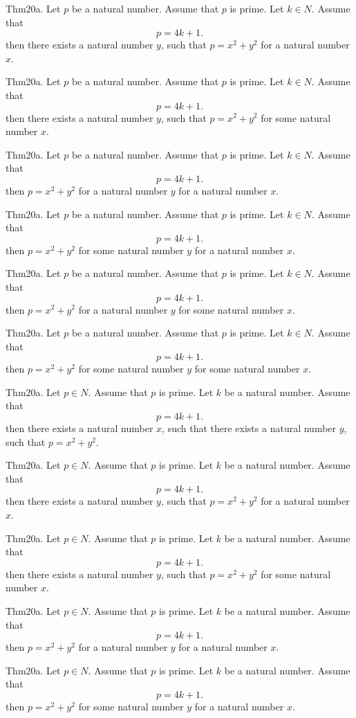 \documentclass{article}
\begin{document}
Thm20a. Let $p$ be a natural number. Assume that $p$ is prime. Let $k \in N$. Assume that $$p = 4 k + 1.$$ then there exists a natural number $y$, such that $p = x ^{ 2}+ y ^{ 2}$ for a natural number $x$.

Thm20a. Let $p$ be a natural number. Assume that $p$ is prime. Let $k \in N$. Assume that $$p = 4 k + 1.$$ then there exists a natural number $y$, such that $p = x ^{ 2}+ y ^{ 2}$ for some natural number $x$.

Thm20a. Let $p$ be a natural number. Assume that $p$ is prime. Let $k \in N$. Assume that $$p = 4 k + 1.$$ then $p = x ^{ 2}+ y ^{ 2}$ for a natural number $y$ for a natural number $x$.

Thm20a. Let $p$ be a natural number. Assume that $p$ is prime. Let $k \in N$. Assume that $$p = 4 k + 1.$$ then $p = x ^{ 2}+ y ^{ 2}$ for some natural number $y$ for a natural number $x$.

Thm20a. Let $p$ be a natural number. Assume that $p$ is prime. Let $k \in N$. Assume that $$p = 4 k + 1.$$ then $p = x ^{ 2}+ y ^{ 2}$ for a natural number $y$ for some natural number $x$.

Thm20a. Let $p$ be a natural number. Assume that $p$ is prime. Let $k \in N$. Assume that $$p = 4 k + 1.$$ then $p = x ^{ 2}+ y ^{ 2}$ for some natural number $y$ for some natural number $x$.

Thm20a. Let $p \in N$. Assume that $p$ is prime. Let $k$ be a natural number. Assume that $$p = 4 k + 1.$$ then there exists a natural number $x$, such that there exists a natural number $y$, such that $p = x ^{ 2}+ y ^{ 2}$.

Thm20a. Let $p \in N$. Assume that $p$ is prime. Let $k$ be a natural number. Assume that $$p = 4 k + 1.$$ then there exists a natural number $y$, such that $p = x ^{ 2}+ y ^{ 2}$ for a natural number $x$.

Thm20a. Let $p \in N$. Assume that $p$ is prime. Let $k$ be a natural number. Assume that $$p = 4 k + 1.$$ then there exists a natural number $y$, such that $p = x ^{ 2}+ y ^{ 2}$ for some natural number $x$.

Thm20a. Let $p \in N$. Assume that $p$ is prime. Let $k$ be a natural number. Assume that $$p = 4 k + 1.$$ then $p = x ^{ 2}+ y ^{ 2}$ for a natural number $y$ for a natural number $x$.

Thm20a. Let $p \in N$. Assume that $p$ is prime. Let $k$ be a natural number. Assume that $$p = 4 k + 1.$$ then $p = x ^{ 2}+ y ^{ 2}$ for some natural number $y$ for a natural number $x$.
\end{document}
